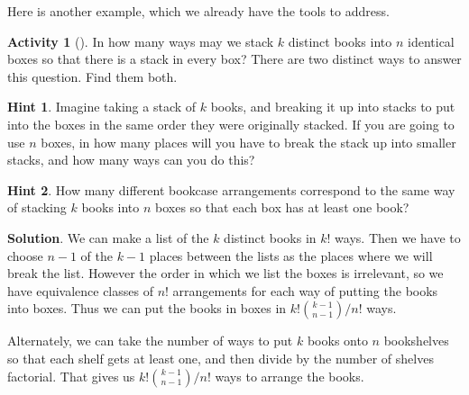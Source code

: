 \documentclass[10pt,]{book}
\theoremstyle{plain}
\theoremstyle{definition}
\theoremstyle{definition}
\theoremstyle{definition}
\newtheorem{activity}[project]{Activity}
\theoremstyle{definition}
\numberwithin{equation}{chapter}
\begin{document}
\par
\hypertarget{p-777}{}%
Here is another example, which we already have the tools to address.%
\begin{activity}[]\label{brokenpermutation}
\hypertarget{p-778}{}%
In how many ways may we stack \(k\) distinct books into \(n\) identical boxes so that there is a stack in every box? There are two distinct ways to answer this question.  Find them both.%
\par\smallskip%
\noindent\textbf{Hint 1}.\hypertarget{hint-65}{}\quad%
\hypertarget{p-779}{}%
Imagine taking a stack of \(k\) books, and breaking it up into stacks to put into the boxes in the same order they were originally stacked. If you are going to use \(n\) boxes, in how many places will you have to break the stack up into smaller stacks, and how many ways can you do this?%
\par\smallskip%
\noindent\textbf{Hint 2}.\hypertarget{hint-66}{}\quad%
\hypertarget{p-780}{}%
How many different bookcase arrangements correspond to the same way of stacking \(k\) books into \(n\) boxes so that each box has at least one book?%
\par\smallskip%
\noindent\textbf{Solution}.\hypertarget{solution-75}{}\quad%
\hypertarget{p-781}{}%
We can make a list of the \(k\) distinct books in \(k!\) ways. Then we have to choose \(n-1\) of the \(k-1\) places between the lists as the places where we will break the list. However the order in which we list the boxes is irrelevant, so we have equivalence classes of \(n!\) arrangements for each way of putting the books into boxes. Thus we can put the books in boxes in \(k!\binom{k-1}{n-1}/n!\) ways.%
\par
\hypertarget{p-782}{}%
Alternately, we can take the number of ways to put \(k\) books onto \(n\) bookshelves so that each shelf gets at least one, and then divide by the number of shelves factorial. That gives us \(k!\binom{k-1}{n-1}/n!\) ways to arrange the books.%
\end{activity}
\hypertarget{p-783}{}%
\end{document}
